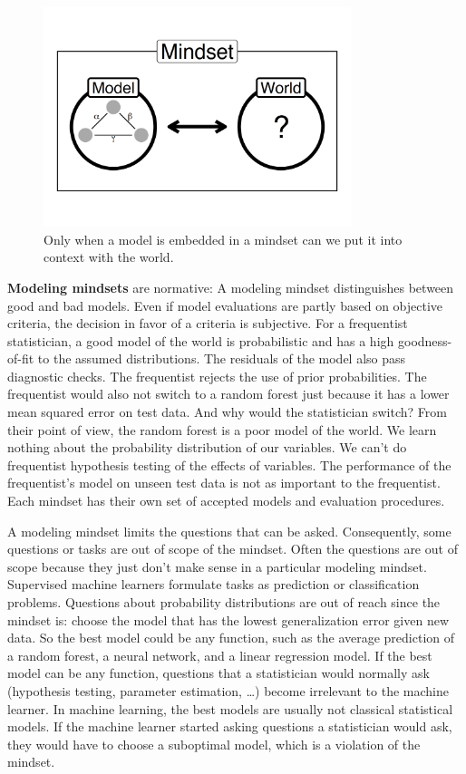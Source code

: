 \documentclass[
  10pt,
]{scrbook}
\begin{document}
\begin{figure}

{\centering \includegraphics[width=0.8\textwidth]{figures/mindset-1} 

}

\caption{Only when a model is embedded in a mindset can we put it into context with the world.}\label{fig:mindset}
\end{figure}

\textbf{Modeling mindsets} are normative:
A modeling mindset distinguishes between good and bad models.
Even if model evaluations are partly based on objective criteria, the decision in favor of a criteria is subjective.
For a frequentist statistician, a good model of the world is probabilistic and has a high goodness-of-fit to the assumed distributions.
The residuals of the model also pass diagnostic checks.
The frequentist rejects the use of prior probabilities.
The frequentist would also not switch to a random forest just because it has a lower mean squared error on test data.
And why would the statistician switch?
From their point of view, the random forest is a poor model of the world.
We learn nothing about the probability distribution of our variables.
We can't do frequentist hypothesis testing of the effects of variables.
The performance of the frequentist's model on unseen test data is not as important to the frequentist.
Each mindset has their own set of accepted models and evaluation procedures.

A modeling mindset limits the questions that can be asked.
Consequently, some questions or tasks are out of scope of the mindset.
Often the questions are out of scope because they just don't make sense in a particular modeling mindset.
Supervised machine learners formulate tasks as prediction or classification problems.
Questions about probability distributions are out of reach since the mindset is: choose the model that has the lowest generalization error given new data.
So the best model could be any function, such as the average prediction of a random forest, a neural network, and a linear regression model.
If the best model can be any function, questions that a statistician would normally ask (hypothesis testing, parameter estimation, \ldots) become irrelevant to the machine learner.
In machine learning, the best models are usually not classical statistical models.
If the machine learner started asking questions a statistician would ask, they would have to choose a suboptimal model, which is a violation of the mindset.
\end{document}
